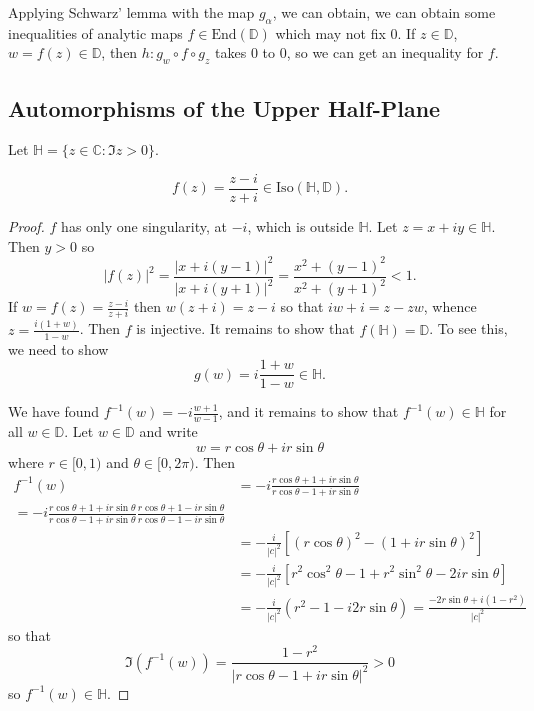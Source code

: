 \begin{remark}
Applying Schwarz' lemma with the map $g_\alpha$, we
can obtain, we can obtain some inequalities of
analytic maps $f \in \mathrm{End}(\mathbb{D})$ which
may not fix $0$.
If $z \in \mathbb{D}$, $w = f(z) \in \mathbb{D}$, then
$h : g_w \circ f \circ g_z$ takes 0 to 0, so
we can get an inequality for $f$.
\end{remark}

\subsection{Automorphisms of the Upper Half-Plane}
Let $\mathbb{H} = \{ z \in \mathbb{C} : \Im z > 0 \}$.
\begin{theorem}
$$
  f(z)
= \frac{z - i}{z + i}
\in \mathrm{Iso}(\mathbb{H}, \mathbb{D}).
$$
\end{theorem}
\begin{proof}
$f$ has only one singularity, at $-i$, which is outside $\mathbb{H}$.
Let $z = x + iy \in \mathbb{H}$. Then $y > 0$ so
$$
  |f(z)|^2
= \frac{|x + i(y - 1)|^2}
       {|x + i(y + 1)|^2}
= \frac{x^2 + (y - 1)^2}
       {x^2 + (y + 1)^2}
< 1.
$$
If $w = f(z) = \frac{z - i}{z + i}$ then
$w (z + i) = z - i$ so that
$i w + i = z - z w$, whence
$z = \frac{i (1 + w)}{1 - w}$. Then $f$ is injective.
It remains to show that $f(\mathbb{H}) = \mathbb{D}$. To see this,
we need to show
$$
g(w) = i \frac{1 + w}{1 - w} \in \mathbb{H}.
$$

We have found $f^{-1}(w) = -i \frac{w + 1}{w - 1}$, and it remains
to show that $f^{-1}(w) \in \mathbb{H}$ for all $w \in \mathbb{D}$.
Let $w \in \mathbb{D}$ and write
$$
w = r \cos \theta + i r \sin \theta
$$
where $r \in [0, 1)$ and $\theta \in [0, 2 \pi)$. Then
\begin{align*}
   f^{-1}(w)
&= -i \frac{r \cos \theta + 1 + i r \sin \theta}
           {r \cos \theta - 1 + i r \sin \theta} \\
 = -i \frac{r \cos \theta + 1 + i r \sin \theta}
           {r \cos \theta - 1 + i r \sin \theta}
      \frac{r \cos \theta + 1 - i r \sin \theta}
           {r \cos \theta - 1 - i r \sin \theta} \\
&= -\frac{i}{|c|^2}
    [(r \cos \theta)^2 - (1 + i r \sin \theta)^2] \\
&= -\frac{i}{|c|^2}
    [ r^2 \cos^2 \theta - 1 + r^2 \sin^2 \theta
    - 2 i r \sin \theta] \\
&= -\frac{i}{|c|^2}
   (r^2 - 1 - i 2 r \sin \theta)
 = \frac{-2 r \sin \theta + i(1 - r^2)}
        {|c|^2}
\end{align*}
so that
$$
  \Im(f^{-1}(w))
= \frac{1 - r^2}
       {|r \cos \theta - 1 + i r \sin \theta|^2}
> 0
$$
so $f^{-1}(w) \in \mathbb{H}$.
\end{proof}

